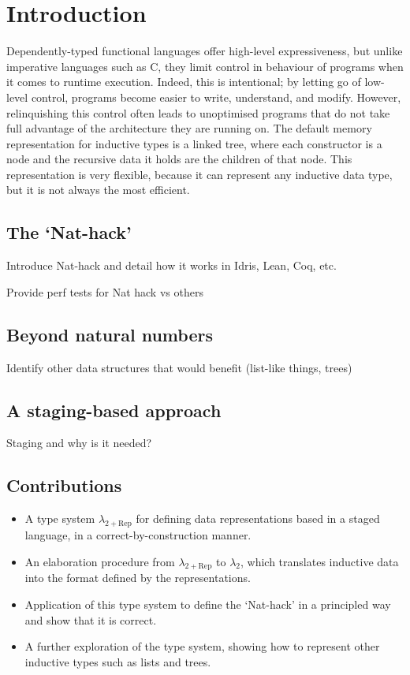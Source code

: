 \section{Introduction}\label{sec:intro}

Dependently-typed functional languages offer high-level expressiveness, but
unlike imperative languages such as C, they limit control in behaviour of
programs when it comes to runtime execution. Indeed, this is intentional; by
letting go of low-level control, programs become easier to write, understand,
and modify. However, relinquishing this control often leads to unoptimised
programs that do not take full advantage of the architecture they are running
on. The default memory representation for inductive types is a linked tree,
where each constructor is a node and the recursive data it holds are the
children of that node. This representation is very flexible, because it can
represent any inductive data type, but it is not always the most efficient.

\subsection{The `Nat-hack'}

Introduce Nat-hack and detail how it works in Idris, Lean, Coq, etc.

Provide perf tests for Nat hack vs others

\subsection{Beyond natural numbers}

Identify other data structures that would benefit (list-like things, trees)

\subsection{A staging-based approach}

Staging and why is it needed?

\subsection{Contributions}

\begin{itemize}
  \item A type system $\lambda_{2+\text{Rep}}$ for defining data representations based
        in a staged language, in a correct-by-construction manner.
  \item An elaboration procedure from $\lambda_{2+\text{Rep}}$ to $\lambda_2$, which
        translates inductive data into the format defined by the representations.
  \item Application of this type system to define the `Nat-hack' in a principled way
        and show that it is correct.
  \item A further exploration of the type system, showing how to represent other
        inductive types such as lists and trees.
\end{itemize}

